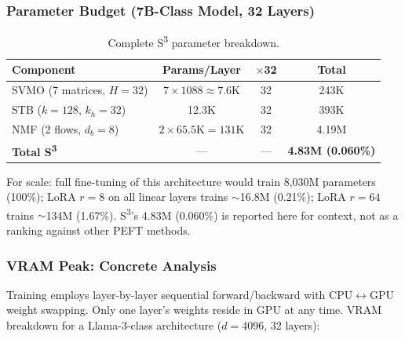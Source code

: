 \documentclass{scpe}
\begin{document}
\subsubsection{Parameter Budget (7B-Class Model, 32 Layers)}

\begin{table}[t]
\centering
\caption{Complete S\textsuperscript{3} parameter breakdown.}
\label{tab:params}
\setlength{\tabcolsep}{2pt}
\begin{tabular}{@{}lccc@{}}
\toprule
\textbf{Component} & \textbf{Params/Layer} & $\times$32 & \textbf{Total} \\
\midrule
SVMO (7 matrices, $H{=}32$) & $7 \times 1088 \approx 7.6$K & 32 & 243K \\
STB ($k{=}128$, $k_h{=}32$) & 12.3K & 32 & 393K \\
NMF (2 flows, $d_b{=}8$) & $2 \times 65.5\text{K} = 131$K & 32 & 4.19M \\
\midrule
\textbf{Total S\textsuperscript{3}} & --- & --- & \textbf{4.83M (0.060\%)} \\
\bottomrule
\end{tabular}
\end{table}

For scale: full fine-tuning of this architecture would train 8{,}030M parameters (100\%); LoRA $r{=}8$ on all linear layers trains $\sim$16.8M (0.21\%); LoRA $r{=}64$ trains $\sim$134M (1.67\%). S\textsuperscript{3}'s 4.83M (0.060\%) is reported here for context, not as a ranking against other PEFT methods.

\subsubsection{VRAM Peak: Concrete Analysis}
\label{sec:vram-gap}

Training employs layer-by-layer sequential forward/backward with CPU$\leftrightarrow$GPU weight swapping. Only one layer's weights reside in GPU at any time. VRAM breakdown for a Llama-3-class architecture ($d{=}4096$, 32 layers):
\end{document}
